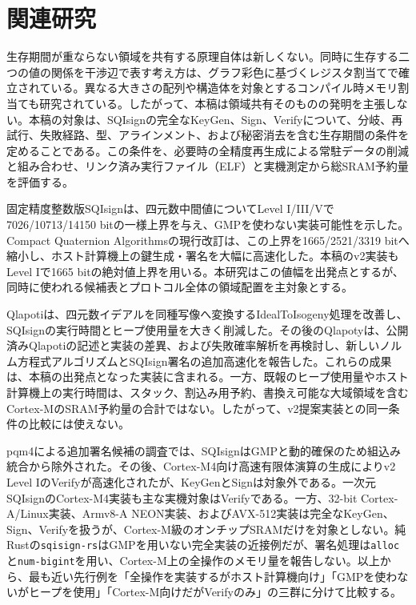 \documentclass[a4paper,10pt]{ltjsarticle}
\theoremstyle{definition}
\theoremstyle{remark}
\begin{document}
\section{関連研究}
\label{sec:related-work}

生存期間が重ならない領域を共有する原理自体は新しくない。同時に生存する二つの値の関係を干渉辺で表す考え方は、グラフ彩色に基づくレジスタ割当てで確立されている\cite{chaitin-1981}。異なる大きさの配列や構造体を対象とするコンパイル時メモリ割当ても研究されている\cite{gergov-1999}。したがって、本稿は領域共有そのものの発明を主張しない。本稿の対象は、SQIsignの完全なKeyGen、Sign、Verifyについて、分岐、再試行、失敗経路、型、アラインメント、および秘密消去を含む生存期間の条件を定めることである。この条件を、必要時の全精度再生成による常駐データの削減と組み合わせ、リンク済み実行ファイル（ELF）と実機測定から総SRAM予約量を評価する。

固定精度整数版SQIsignは、四元数中間値についてLevel I/III/Vで7026/10713/14150 bitの一様上界を与え、GMPを使わない実装可能性を示した\cite{fixed-precision-2025}。Compact Quaternion Algorithmsの現行改訂は、この上界を1665/2521/3319 bitへ縮小し、ホスト計算機上の鍵生成・署名を大幅に高速化した\cite{compact-quaternion-2026}。本稿のv2実装もLevel Iで1665 bitの絶対値上界を用いる。本研究はこの値幅を出発点とするが、同時に使われる候補表とプロトコル全体の領域配置を主対象とする。

Qlapotiは、四元数イデアルを同種写像へ変換するIdealToIsogeny処理を改善し、SQIsignの実行時間とヒープ使用量を大きく削減した\cite{qlapoti-2025,qlapoti-plus-2026}。その後のQlapotyは、公開済みQlapotiの記述と実装の差異、および失敗確率解析を再検討し、新しいノルム方程式アルゴリズムとSQIsign署名の追加高速化を報告した\cite{qlapoty-2026}。これらの成果は、本稿の出発点となった実装に含まれる。一方、既報のヒープ使用量やホスト計算機上の実行時間は、スタック、割込み用予約、書換え可能な大域領域を含むCortex-MのSRAM予約量の合計ではない。したがって、v2提案実装との同一条件の比較には使えない。

pqm4による追加署名候補の調査では、SQIsignはGMPと動的確保のため組込み統合から除外された\cite{pqm4-2024}。その後、Cortex-M4向け高速有限体演算の生成によりv2 Level IのVerifyが高速化されたが、KeyGenとSignは対象外である\cite{m4-modarith-2025}。一次元SQIsignのCortex-M4実装も主な実機対象はVerifyである\cite{sqisign-1d-2024}。一方、32-bit Cortex-A/Linux実装、Armv8-A NEON実装、およびAVX-512実装は完全なKeyGen、Sign、Verifyを扱うが、Cortex-M級のオンチップSRAMだけを対象としない\cite{sqisign-32bit-2024,sqisign-arm-2026,sqisign-avx512-2026}。純Rustの\texttt{sqisign-rs}はGMPを用いない完全実装の近接例だが、署名処理は\texttt{alloc}と\texttt{num-bigint}を用い、Cortex-M上の全操作のメモリ量を報告しない\cite{sqisign-rs-2026}。以上から、最も近い先行例を「全操作を実装するがホスト計算機向け」「GMPを使わないがヒープを使用」「Cortex-M向けだがVerifyのみ」の三群に分けて比較する。
\end{document}
